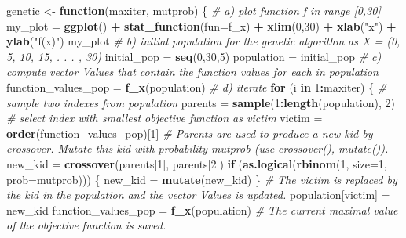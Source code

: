 \documentclass[
]{article}
\newenvironment{Shaded}{\begin{snugshade}}{\end{snugshade}}
\newcommand{\CommentTok}[1]{\textcolor[rgb]{0.56,0.35,0.01}{\textit{#1}}}
\newcommand{\ControlFlowTok}[1]{\textcolor[rgb]{0.13,0.29,0.53}{\textbf{#1}}}
\newcommand{\DataTypeTok}[1]{\textcolor[rgb]{0.13,0.29,0.53}{#1}}
\newcommand{\DecValTok}[1]{\textcolor[rgb]{0.00,0.00,0.81}{#1}}
\newcommand{\KeywordTok}[1]{\textcolor[rgb]{0.13,0.29,0.53}{\textbf{#1}}}
\newcommand{\NormalTok}[1]{#1}
\newcommand{\OperatorTok}[1]{\textcolor[rgb]{0.81,0.36,0.00}{\textbf{#1}}}
\newcommand{\StringTok}[1]{\textcolor[rgb]{0.31,0.60,0.02}{#1}}
\begin{document}
\begin{Shaded}
\begin{Highlighting}[]
\NormalTok{genetic <-}\StringTok{ }\ControlFlowTok{function}\NormalTok{(maxiter, mutprob) \{}
  \CommentTok{# a) plot function f in range [0,30]}
\NormalTok{  my_plot =}\StringTok{ }\KeywordTok{ggplot}\NormalTok{() }\OperatorTok{+}\StringTok{ }\KeywordTok{stat_function}\NormalTok{(}\DataTypeTok{fun=}\NormalTok{f_x) }\OperatorTok{+}\StringTok{ }\KeywordTok{xlim}\NormalTok{(}\DecValTok{0}\NormalTok{,}\DecValTok{30}\NormalTok{) }\OperatorTok{+}\StringTok{ }\KeywordTok{xlab}\NormalTok{(}\StringTok{"x"}\NormalTok{) }\OperatorTok{+}\StringTok{ }\KeywordTok{ylab}\NormalTok{(}\StringTok{"f(x)"}\NormalTok{)}
\NormalTok{  my_plot}
  \CommentTok{# b) initial population for the genetic algorithm as X = (0, 5, 10, 15, . . . , 30)}
\NormalTok{  initial_pop =}\StringTok{ }\KeywordTok{seq}\NormalTok{(}\DecValTok{0}\NormalTok{,}\DecValTok{30}\NormalTok{,}\DecValTok{5}\NormalTok{)}
\NormalTok{  population =}\StringTok{ }\NormalTok{initial_pop}
  \CommentTok{# c) compute vector Values that contain the function values for each in population}
\NormalTok{  function_values_pop =}\StringTok{ }\KeywordTok{f_x}\NormalTok{(population)}
  \CommentTok{# d) iterate}
  \ControlFlowTok{for}\NormalTok{ (i }\ControlFlowTok{in} \DecValTok{1}\OperatorTok{:}\NormalTok{maxiter) \{}
    \CommentTok{# sample two indexes from population}
\NormalTok{    parents =}\StringTok{ }\KeywordTok{sample}\NormalTok{(}\DecValTok{1}\OperatorTok{:}\KeywordTok{length}\NormalTok{(population), }\DecValTok{2}\NormalTok{)}
    \CommentTok{# select index with smallest objective function as victim}
\NormalTok{    victim =}\StringTok{ }\KeywordTok{order}\NormalTok{(function_values_pop)[}\DecValTok{1}\NormalTok{]}
    \CommentTok{# Parents are used to produce a new kid by crossover. Mutate this kid with probability mutprob (use crossover(), mutate()).}
\NormalTok{    new_kid =}\StringTok{ }\KeywordTok{crossover}\NormalTok{(parents[}\DecValTok{1}\NormalTok{], parents[}\DecValTok{2}\NormalTok{])}
    \ControlFlowTok{if}\NormalTok{ (}\KeywordTok{as.logical}\NormalTok{(}\KeywordTok{rbinom}\NormalTok{(}\DecValTok{1}\NormalTok{, }\DataTypeTok{size=}\DecValTok{1}\NormalTok{, }\DataTypeTok{prob=}\NormalTok{mutprob))) \{}
\NormalTok{      new_kid =}\StringTok{ }\KeywordTok{mutate}\NormalTok{(new_kid) }
\NormalTok{    \}}
    \CommentTok{# The victim is replaced by the kid in the population and the vector Values is updated.}
\NormalTok{    population[victim] =}\StringTok{ }\NormalTok{new_kid}
\NormalTok{    function_values_pop =}\StringTok{ }\KeywordTok{f_x}\NormalTok{(population)}
    \CommentTok{# The current maximal value of the objective function is saved.}

\end{Highlighting}
\end{Shaded}
\end{document}
